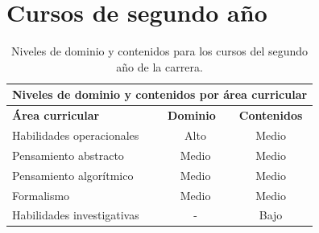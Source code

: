 ﻿%
\newpage 
\section{Cursos de segundo año}


\begin{table}[H]
\begin{center}
\begin{tabular}{|ccc|}
\hline
\multicolumn{3}{|c|}{\cellcolor[HTML]{00C0F3} \textbf{Niveles de dominio y contenidos por área curricular}} \\ \hline
\multicolumn{1}{|l|}{\cellcolor[HTML]{8ED8F8}\textbf{Área curricular}} & \multicolumn{1}{l|}{\cellcolor[HTML]{8ED8F8}\textbf{Dominio}} & \cellcolor[HTML]{8ED8F8}\textbf{Contenidos} \\ \hline
\multicolumn{1}{|l|}{Habilidades operacionales} & \multicolumn{1}{c|}{Alto} & Medio \\ \hline
\multicolumn{1}{|l|}{Pensamiento abstracto} & \multicolumn{1}{c|}{Medio} & Medio \\ \hline
\multicolumn{1}{|l|}{Pensamiento algorítmico} & \multicolumn{1}{c|}{Medio} & Medio \\ \hline
\multicolumn{1}{|l|}{Formalismo} & \multicolumn{1}{c|}{Medio} & Medio \\ \hline
\multicolumn{1}{|l|}{Habilidades investigativas} & \multicolumn{1}{c|}{-} & Bajo \\ \hline
\end{tabular}
\end{center}
\caption{Niveles de dominio y contenidos para los cursos del segundo año de la carrera.}
\end{table}



\newpage

